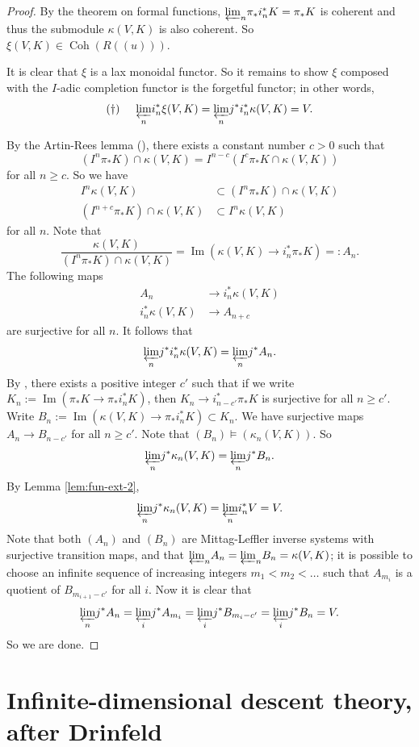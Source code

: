 \documentclass[11pt]{amsart}
\numberwithin{thm}{section}
\numberwithin{lem}{section}
\numberwithin{cor}{section}
\numberwithin{prop}{section}
\numberwithin{exam}{section}
\numberwithin{dfn}{section}
\newcommand{\Img}{\operatorname{Im}}
\newcommand{\Coh}{\operatorname{Coh}}
\newcommand{\invlim}[1]{{\varprojlim_{#1}}}
\newcommand{\mychapter}{\section}
\begin{document}
\begin{appendices}
\begin{proof}
By the theorem on formal functions,
$\invlim{n} \pi_*i_n^*K = \pi_*K$ is coherent and thus the submodule
$\kappa(V,K)$ is also coherent.
So $\xi(V, K)\in \Coh(R(\!(u)\!))$.

It is clear that $\xi$ is a lax monoidal functor.
So it remains to show $\xi$ composed with
the $I$-adic completion functor is the forgetful functor;
in other words,
$$
\text{($\dagger$)}\hspace{5mm}\invlim{n} i_n^*\xi (V, K)
=\invlim{n} j^* i_n^* \kappa(V, K)= V.
$$

By the Artin-Rees lemma (\cite[Tag 00IN]{Stacks}),
there exists a constant number $c>0$ such that
$$
(I^n \pi_*K)\cap \kappa(V, K) = I^{n-c}(I^c \pi_*K\cap \kappa(V, K))
$$
for all $n\ge c$.
So we have
\begin{align*}
I^n \kappa(V,K) & \subset (I^n \pi_*K) \cap \kappa(V,K) \\
(I^{n+c} \pi_*K) \cap \kappa(V,K) & \subset I^n \kappa(V,K)
\end{align*}
for all $n$.
Note that
$$
\frac{\kappa(V,K)}{(I^n \pi_*K) \cap \kappa(V,K)}
=\Img(\kappa(V,K)\to i_n^*\pi_*K) =:A_n.
$$
The following maps
\begin{align*}
A_n &\to i_n^* \kappa(V,K) \\
i_n^* \kappa(V,K) &\to A_{n+c}
\end{align*}
are surjective for all $n$.
It follows that
$$
\invlim{n} j^* i_n^*\kappa(V,K) = \invlim{n} j^* A_n.
$$
By \cite[Tag 02OB]{Stacks}, there exists a positive integer
$c'$ such that
if we write $K_n:=\Img(\pi_*K \to \pi_*i_n^*K)$,
then $K_n \to i^*_{n-c'}\pi_*K$
is surjective for all $n\ge c'$.
Write $B_n:=\Img(\kappa(V,K) \to \pi_*i_n^*K)\subset K_n$.
We have surjective maps $A_n \to B_{n-c'}$ for all $n \ge c'$.
Note that
$(B_n) \models (\kappa_n(V,K))$. So
$$
\invlim{n} j^* \kappa_n(V,K) = \invlim{n} j^* B_n.
$$
By Lemma \ref{lem:fun-ext-2},
$$
\invlim{n} j^* \kappa_n(V,K) = \invlim{n} i_n^*V = V.
$$
Note that both $(A_n)$ and $(B_n)$ are Mittag-Leffler inverse systems with
surjective transition maps,
and that $\invlim{n} A_n =\invlim{n} B_n= \kappa(V,K)$;
it is possible to choose an infinite sequence of increasing integers
$m_1 < m_2 < \dots$
such that $A_{m_i}$ is a quotient of $B_{m_{i+1}-c'}$ for all $i$.
Now it is clear that
$$
\invlim{n} j^* A_n=
\invlim{i} j^* A_{m_i}=
\invlim{i} j^* B_{m_i-c'}=
\invlim{i} j^* B_{n}
=V.
$$
So we are done.
\end{proof}


\mychapter{Infinite-dimensional descent theory, after Drinfeld}


\end{appendices}
\end{document}
